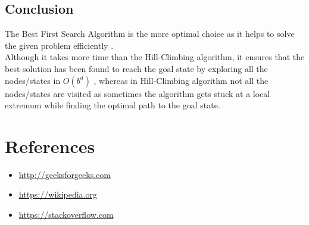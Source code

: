 \documentclass{article}
\begin{document}
\subsection*{Conclusion}
The Best First Search Algorithm is the more optimal choice as it helps to solve the given problem
efficiently .
\vspace{5pt}
\\Although it takes more time than the Hill-Climbing algorithm, it ensures that the best solution
has been found to reach the goal state by exploring all the nodes/states in $O(b^d)$ , whereas in Hill-Climbing algorithm
not all the nodes/states are visited as sometimes the algorithm gets stuck at a local extremum while finding the optimal path to the goal state.
\newpage
\section{References}
\vspace{30pt}
\begin{itemize}
    \item \url{http://geeksforgeeks.com}
    \item \url{https://wikipedia.org}
    \item \url{https://stackoverflow.com}
\end{itemize}
\end{document}
